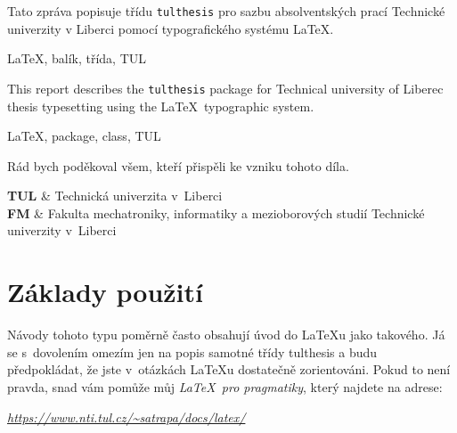 \documentclass[fonts,numbering,twoside,margins]{./tulpackage/tulthesis}
\newcommand{\argument}[1]{{\ttfamily\color{\tulcolor}#1}}
\newenvironment{myquote}{\begin{list}{}{\setlength\leftmargin\parindent}\item[]}{\end{list}}
\begin{document}

\begin{abstractCZ}
Tato zpráva popisuje třídu \thinspace \texttt{tulthesis} \thinspace pro sazbu absolventských prací Technické univerzity v Liberci pomocí typografického systému \LaTeX.
\end{abstractCZ}

\begin{keywordsCZ}
\LaTeX, balík, třída, TUL
\end{keywordsCZ}

\vspace{2cm}

\begin{abstractEN}
This report describes the \thinspace \texttt{tulthesis} \thinspace package for Technical university of Liberec thesis typesetting using the \LaTeX\ typographic system.
\end{abstractEN}

\begin{keywordsEN}
\LaTeX, package, class, TUL
\end{keywordsEN}

\clearpage

\begin{acknowledgement}
Rád bych poděkoval všem, kteří přispěli ke vzniku tohoto díla.
\end{acknowledgement}

\TULthesisTOC

\begin{abbrList}
\textbf{TUL} & Technická univerzita v~Liberci \\
\textbf{FM} & Fakulta mechatroniky, informatiky a mezioborových studií
Technické univerzity v~Liberci \\
\end{abbrList}

\chapter{Základy použití}

Návody tohoto typu poměrně často obsahují úvod do \LaTeX u jako takového. Já se
s~dovolením omezím jen na popis samotné třídy \argument{tulthesis} a budu
předpokládat, že jste v~otázkách \LaTeX u dostatečně zorientováni. Pokud
to není pravda, snad vám pomůže můj \emph{\LaTeX\ pro pragmatiky}, který
najdete na adrese:

\begin{myquote}
\href{https://www.nti.tul.cz/~satrapa/docs/latex/}{\emph{https://www.nti.tul.cz/\textasciitilde satrapa/docs/latex/}}
\end{myquote}
\end{document}
